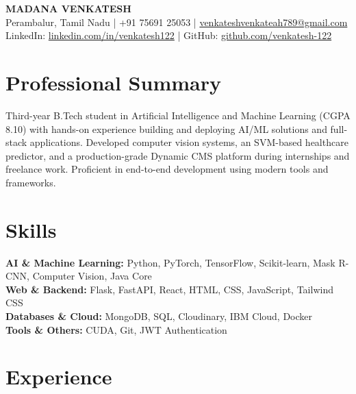 \documentclass[a4paper,10pt]{article}
\begin{document}
\begin{center}
{\Huge \textbf{MADANA VENKATESH}}\\[2pt]
Perambalur, Tamil Nadu \;|\; +91 75691 25053 \;|\;
\href{mailto:venkateshvenkateah789@gmail.com}{venkateshvenkateah789@gmail.com}\\[1pt]
LinkedIn: \href{https://linkedin.com/in/venkatesh122}{linkedin.com/in/venkatesh122} \;|\;
GitHub: \href{https://github.com/venkatesh-122}{github.com/venkatesh-122}
\end{center}

\vspace{-6pt}

\section*{Professional Summary}
Third-year B.Tech student in Artificial Intelligence and Machine Learning (CGPA 8.10) with hands-on experience building and deploying AI/ML solutions and full-stack applications. Developed computer vision systems, an SVM-based healthcare predictor, and a production-grade Dynamic CMS platform during internships and freelance work. Proficient in end-to-end development using modern tools and frameworks.

\section*{Skills}
\textbf{AI \& Machine Learning:} Python, PyTorch, TensorFlow, Scikit-learn, Mask R-CNN, Computer Vision, Java Core\\
\textbf{Web \& Backend:} Flask, FastAPI, React, HTML, CSS, JavaScript, Tailwind CSS\\
\textbf{Databases \& Cloud:} MongoDB, SQL, Cloudinary, IBM Cloud, Docker\\
\textbf{Tools \& Others:} CUDA, Git, JWT Authentication

\section*{Experience}
\end{document}
